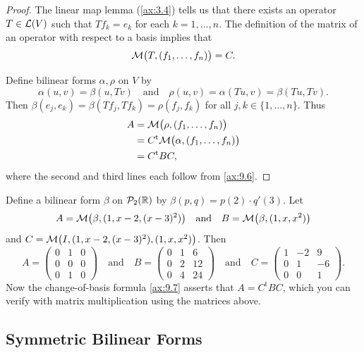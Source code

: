 \begin{proof}
The linear map lemma (\ref{ax:3.4}) tells us that there exists an operator
$T\in\mathcal{L}(V)$ such that $Tf_k=e_k$ for each $k=1,\dots,n$. The definition of
the matrix of an operator with respect to a basis implies that
\[ \mathcal{M}\bigl(T,(f_1,\dots,f_n)\bigr) = C. \]

Define bilinear forms $\alpha,\rho$ on $V$ by
\[ \alpha(u,v) = \beta(u,Tv) \quad\text{and}\quad
   \rho(u,v) = \alpha(Tu,v) = \beta(Tu,Tv). \]
Then $\beta(e_j,e_k)=\beta(Tf_j,Tf_k)=\rho(f_j,f_k)$ for all
$j,k\in\{1,\dots,n\}$. Thus
\begin{align*}
A &= \mathcal{M}\bigl(\rho,(f_1,\dots,f_n)\bigr)\\
  &= C^{\mathrm{t}}\mathcal{M}\bigl(\alpha,(f_1,\dots,f_n)\bigr)\\
  &= C^{\mathrm{t}}BC,
\end{align*}
where the second and third lines each follow from \ref{ax:9.6}.
\end{proof}

\begin{example}\label{ax:9.8}
Define a bilinear form $\beta$ on $\mathcal{P}_2(\mathbb{R})$ by
$\beta(p,q)=p(2)\cdot q'(3)$. Let
\[ A = \mathcal{M}\bigl(\beta,(1,x-2,(x-3)^2)\bigr) \quad\text{and}\quad
   B = \mathcal{M}\bigl(\beta,(1,x,x^2)\bigr) \]
and $C=\mathcal{M}\bigl(I,(1,x-2,(x-3)^2),(1,x,x^2)\bigr)$. Then
\[ A = \begin{pmatrix} 0&1&0\\ 0&0&0\\ 0&1&0 \end{pmatrix}
   \quad\text{and}\quad
   B = \begin{pmatrix} 0&1&6\\ 0&2&12\\ 0&4&24 \end{pmatrix}
   \quad\text{and}\quad
   C = \begin{pmatrix} 1&-2&9\\ 0&1&-6\\ 0&0&1 \end{pmatrix}. \]
Now the change-of-basis formula \ref{ax:9.7} asserts that
$A=C^{\mathrm{t}}BC$, which you can verify with matrix multiplication using the
matrices above.
\end{example}

\subsection{Symmetric Bilinear Forms}

